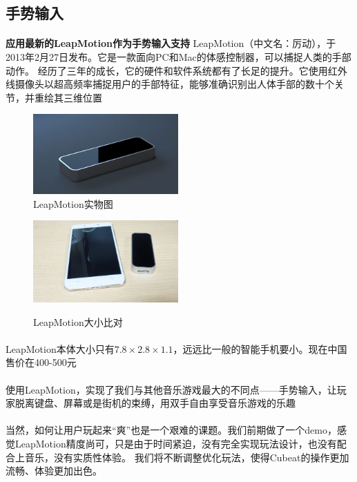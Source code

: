 \documentclass{article}
\begin{document}
\subsection{手势输入}
\paragraph{}
\textbf{应用最新的LeapMotion作为手势输入支持}
LeapMotion（中文名：厉动），于2013年2月27日发布。它是一款面向PC和Mac的体感控制器，可以捕捉人类的手部动作。
经历了三年的成长，它的硬件和软件系统都有了长足的提升。它使用红外线摄像头以超高频率捕捉用户的手部特征，能够准确识别出人体手部的数十个关节，并重绘其三维位置
\begin{figure}[H]
\begin{minipage}{0.5\linewidth}
  \includegraphics[width=15em]{leap.png}\\
  \caption{LeapMotion实物图}\label{3-1}
\end{minipage}
\begin{minipage}{0.5\linewidth}
  \includegraphics[width=15em]{leapCompare.png}\\
  \caption{LeapMotion大小比对}\label{3-2}
\end{minipage}
\end{figure}
\paragraph{}
LeapMotion本体大小只有$7.8\times2.8\times1.1$，远远比一般的智能手机要小。现在中国售价在400-500元
\paragraph{}
使用LeapMotion，实现了我们与其他音乐游戏最大的不同点——手势输入，让玩家脱离键盘、屏幕或是街机的束缚，用双手自由享受音乐游戏的乐趣
\paragraph{}
当然，如何让用户玩起来“爽”也是一个艰难的课题。我们前期做了一个demo，感觉LeapMotion精度尚可，只是由于时间紧迫，没有完全实现玩法设计，也没有配合上音乐，没有实质性体验。
我们将不断调整优化玩法，使得Cubeat的操作更加流畅、体验更加出色。
\end{document}
